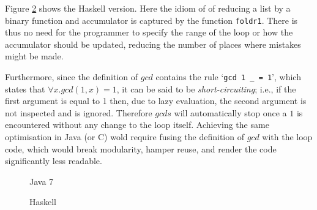Figure \ref{fig:gcds:haskell} shows the Haskell version. Here the idiom
of of reducing a list by a binary function and accumulator is captured
by the function \lstinline|foldr1|. There is thus no need for the programmer
to specify the range of the loop or how the accumulator should be updated,
reducing the number of places where mistakes might be made.

Furthermore, since the definition of $gcd$ contains the rule
`\lstinline|gcd 1 _ = 1|',
which states that $\forall x. gcd (1, x) = 1$, it can be said to be
\emph{short-circuiting}; i.e., if the first argument is equal to 1 then, due
to lazy evaluation, the second argument is not inspected and is ignored.
Therefore $gcds$ will automatically stop once a $1$ is encountered without any
change to the loop itself. Achieving the same optimisation in Java (or C) wold
require fusing the definition of $gcd$ with the loop code, which would break
modularity, hamper reuse, and render the code significantly less readable.

% 

\begin{figure}

\caption{Java 7}
\label{fig:gcds:java}
\end{figure}

\begin{figure}

\caption{Haskell}
\label{fig:gcds:haskell}
\end{figure}





